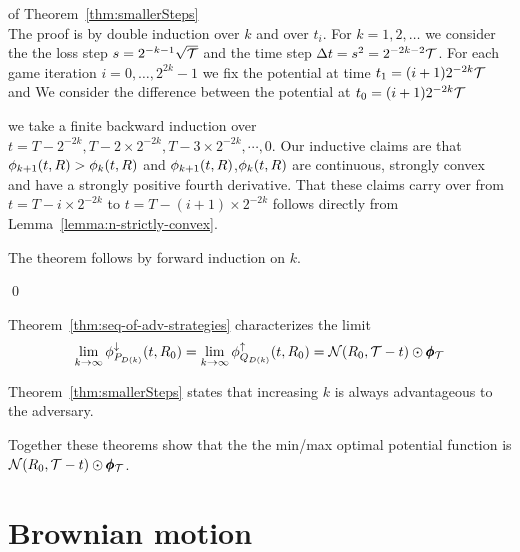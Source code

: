 \documentclass{article}[12pt]
\begin{document}
\proof  of Theorem~\ref{thm:smallerSteps} \\
The proof is by double induction over $k$ and over $t_i$.
For $k=1,2,\ldots$ we consider the the loss step $s=2^{-k-1}\sqrt{\mathcal{T}}$ and the time step 
$\Delta t = s^2=2^{-2k-2} \mathcal{T}$. For each game iteration $i=0,\ldots,2^{2k}-1$
we fix the potential at time $t_1=(i+1) 2^{-2k}\mathcal{T}$ and 
We consider the difference between the potential at $t_0=(i+1) 2^{-2k}\mathcal{T}$

we take a finite backward induction over
$t=T-2^{-2k},T-2 \times 2^{-2k},T-3 \times 2^{-2k},\cdots,0$.
Our inductive claims are that $\phi_{k+1}(t,R) > \phi_{k}(t,R)$ and
$\phi_{k+1}(t,R)$,$\phi_{k}(t,R)$ are continuous, strongly convex and
have a strongly positive fourth derivative. That these claims carry over
from $t=T-i \times 2^{-2k}$ to  $t=T-(i+1) \times 2^{-2k}$ follows
directly from Lemma~\ref{lemma:n-strictly-convex}.

The theorem follows by forward induction on $k$.

\qed


\iffalse
Next, we consider the discrete time version of $\learnerM^2$:
(Eq~\ref{eqn:learner-strat-2})
\begin{eqnarray} \label{eqn:learner-strat-2c}
  \learnerM^{2d}(t_{i},\R) =  \frac{1}{Z^{2d}}
  \left. \frac{\partial}{\partial r} \right|_{r=\R}
  \pot(t_{i}+s_{i}^2,r)
  \\
  \mbox{ where } Z^{2d} = \E{\R \sim
  \state(t_i)}{\left. \frac{\partial}{\partial r} \right|_{r=\R} \pot(t_{i}+s_{i}^2,r)} \nonumber
\end{eqnarray}
\fi

Theorem~\ref{thm:seq-of-adv-strategies} characterizes the limit
\begin{equation} \label{eqn:k-limit}
  \lim_{k \to \infty} \phi_{P_{D(k)}}^{\downarrow}(t,R_0) =
  \lim_{k \to \infty}\phi_{Q_{D(k)}}^{\uparrow}(t,R_0)=
  {\cal N}(R_0,\mathcal{T}-t) \odot \pmb{\phi}_{\mathcal{T}}
\end{equation}

Theorem~\ref{thm:smallerSteps} states that increasing $k$ is always advantageous to the adversary.

Together these theorems show that the the min/max optimal potential function is $ {\cal N}(R_0,\mathcal{T}-t) \odot \pmb{\phi}_{\mathcal{T}}$.

\section{Brownian motion}
\label{sec:continuous}
\end{document}
